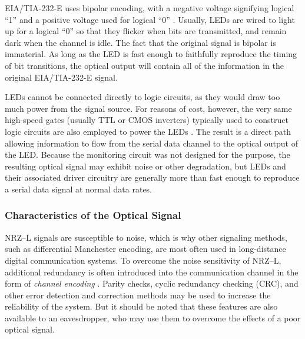 \documentclass{acmtrans2e}
\begin{document}
EIA/TIA-232-E uses bipolar encoding, with a negative voltage signifying 
logical ``1'' and a positive voltage used for logical ``0''
\cite{black}.  Usually, 
LEDs are wired to light up for a logical ``0'' so that they flicker when 
bits are transmitted, and remain dark when the channel is idle.  The 
fact that the original signal is bipolar is immaterial.  As long as 
the LED is fast enough to faithfully reproduce the timing of bit transitions, 
the optical output will contain all of the information in the 
original EIA/TIA-232-E signal.

LEDs cannot be connected directly to logic circuits, as they would draw too 
much power from the signal source.  For reasons of cost, however, the very same high-speed
gates (usually TTL or CMOS inverters) typically used to construct logic circuits
are also employed to power the LEDs \cite{ttl_cookbook}.
The result is a direct path allowing information to flow from the serial
data channel to the optical output of the LED.  Because the monitoring circuit
was not designed for the
purpose, the resulting optical signal may exhibit noise or other degradation,
but LEDs and their associated driver circuitry are generally more than fast
enough to reproduce a serial data signal at normal data rates.

\subsubsection{Characteristics of the Optical Signal}

NRZ--L signals are susceptible to 
noise, which is why other signaling methods, such as differential 
Manchester encoding, are most often used in long-distance digital 
communication systems.  To overcome the noise sensitivity of NRZ--L, 
additional redundancy is often introduced into the communication channel 
in the form of {\it channel encoding} \cite{proakis}.  Parity checks, 
cyclic redundancy checking (CRC), and other error detection and 
correction methods may be used to increase the reliability of the 
system.  But it should be noted that these features are also available 
to an eavesdropper, who may use them to overcome the effects of a poor 
optical signal.
\end{document}
